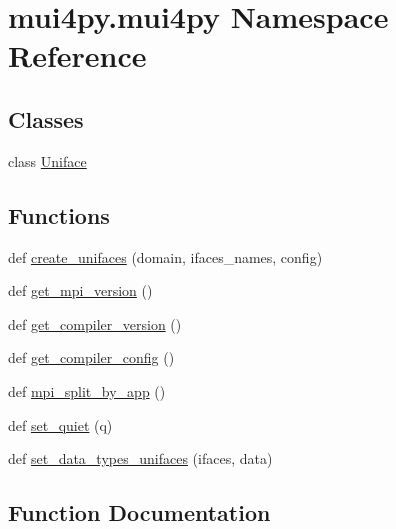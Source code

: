 \hypertarget{namespacemui4py_1_1mui4py}{}\section{mui4py.\+mui4py Namespace Reference}
\label{namespacemui4py_1_1mui4py}
\subsection*{Classes}
\begin{DoxyCompactItemize}
\item 
class \hyperlink{classmui4py_1_1mui4py_1_1_uniface}{Uniface}
\end{DoxyCompactItemize}
\subsection*{Functions}
\begin{DoxyCompactItemize}
\item 
def \hyperlink{namespacemui4py_1_1mui4py_a16665d0b06f2342c063b91f257eac5df}{create\+\_\+unifaces} (domain, ifaces\+\_\+names, config)
\item 
def \hyperlink{namespacemui4py_1_1mui4py_a129d3464dc3cd5bc2bbf1052ed124461}{get\+\_\+mpi\+\_\+version} ()
\item 
def \hyperlink{namespacemui4py_1_1mui4py_a5ecc28daecfe1517f917a3856a203744}{get\+\_\+compiler\+\_\+version} ()
\item 
def \hyperlink{namespacemui4py_1_1mui4py_a339baca3d45358cdbeea666832e1b7ab}{get\+\_\+compiler\+\_\+config} ()
\item 
def \hyperlink{namespacemui4py_1_1mui4py_a28b0f895984b5f5001598343b692061c}{mpi\+\_\+split\+\_\+by\+\_\+app} ()
\item 
def \hyperlink{namespacemui4py_1_1mui4py_af3e1abe07a625961ceb20cec3ff3fdfa}{set\+\_\+quiet} (q)
\item 
def \hyperlink{namespacemui4py_1_1mui4py_aac1ffb9c60e7e3fa4c94f8db37780bad}{set\+\_\+data\+\_\+types\+\_\+unifaces} (ifaces, data)
\end{DoxyCompactItemize}


\subsection{Function Documentation}
\mbox{\label{namespacemui4py_1_1mui4py_a16665d0b06f2342c063b91f257eac5df}} 
